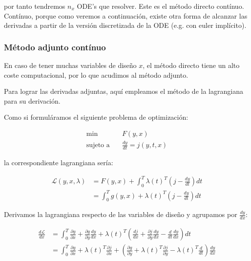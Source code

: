 por tanto tendremos $n_x$ ODE's que resolver. Este es el método directo
contínuo. Contínuo, porque como veremos a continuación, existe otra forma de
alcanzar las derivadas a partir de la versión discretizada de la ODE (e.g. con
euler implícito).


\subsubsection{Método adjunto contínuo}

En caso de tener muchas variables de diseño $x$, el método directo tiene un
alto coste computacional, por lo que acudimos al método adjunto.

Para lograr las derivadas adjuntas, aquí empleamos el método de la lagrangiana
para su derivación.

Como si formuláramos el siguiente problema de optimización:

\begin{align}
	\min \quad           & F(y, x)   \nonumber                                         \\
	\text{sujeto a}\quad & \frac{dy}{dt}  = j(y, t, x)  \label{eq:ode_as_optimization}
\end{align}

la correspondiente lagrangiana sería:

\begin{align}
	\mathcal{L}(y, x, \lambda) & = F(y, x) + \int_0^T \lambda(t)^T(j - \frac{dy}{dt})dt \nonumber                                   \\
	                           & = \int_0^T g(y, x) + \lambda(t)^T (j - \frac{dy}{dt}) dt  \label{eq:continuous_adjoint_lagrangian}
\end{align}

Derivamos la lagrangiana respecto de las variables de diseño y agrupamos por
$\frac{dy}{dx}$:

\begin{align}
	\frac{d \mathcal{L}}{d x} & = \int_0^T \frac{\partial g}{\partial x} + \frac{\partial g}{\partial y} \frac{dy}{dx} + \lambda(t)^T \left(\frac{dj}{dx} + \frac{\partial j}{\partial y} \frac{dy}{dx} - \frac{d}{d t} \frac{dy}{dx} \right) dt   \nonumber                                              \\
	                          & = \int_0^T  \frac{\partial g}{\partial x} + \lambda(t)^T  \frac{\partial j}{\partial x} + \left(  \frac{\partial g}{\partial y} + \lambda(t)^T  \frac{\partial j}{\partial y} - \lambda(t)^T \frac{d}{dt}  \right) \frac{dy}{dx}  \label{eq:dl_dx_ode_continuous_adjoint}
\end{align}

